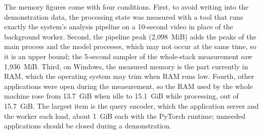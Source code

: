 The memory figures come with four conditions. First, to avoid writing into the demonstration data, the processing state was measured with a tool that runs exactly the system's analysis pipeline on a 10-second video in place of the background worker. Second, the pipeline peak (2,098~MiB) adds the peaks of the main process and the model processes, which may not occur at the same time, so it is an upper bound; the 5-second sampler of the whole-stack measurement saw 1,936~MiB. Third, on Windows, the measured memory is the part currently in RAM, which the operating system may trim when RAM runs low. Fourth, other applications were open during the measurement, so the RAM used by the whole machine rose from 13.7~GiB when idle to 15.1~GiB while processing, out of 15.7~GiB. The largest item is the query encoder, which the application server and the worker each load, about 1~GiB each with the PyTorch runtime; unneeded applications should be closed during a demonstration.
